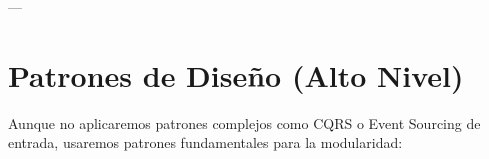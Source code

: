 \documentclass{article}
\begin{document}
\begin{itemize}[label=$\bullet$]
	\end{itemize}
	
	---
	
	\section{Patrones de Diseño (Alto Nivel)}
	Aunque no aplicaremos patrones complejos como CQRS o Event Sourcing de entrada, usaremos patrones fundamentales para la modularidad:
	
\end{document}
